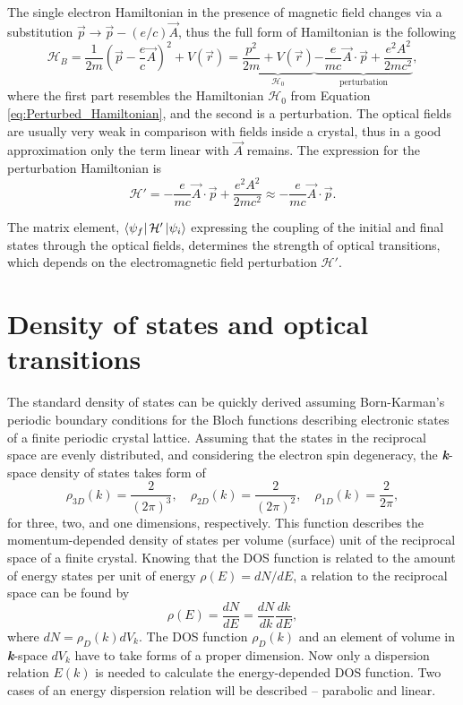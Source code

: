 \documentclass[titlepage,a4paper]{book}
\newcommand{\wciecie}{\quad\phantom{v}}
\begin{document}
The single electron Hamiltonian in the presence of magnetic field changes via a substitution $\vec{p} \rightarrow \vec{p} - (e/c)\vec{A}$, thus the full form of Hamiltonian is the following
\begin{equation}
\label{eq:Perturbed_Hamiltonian2}
\mathcal{H}_{B} = \frac{1}{2m}\left( \vec{p} - \frac{e}{c}\vec{A}\right)^2 + V(\vec{r}) = \underbrace{\frac{p^2}{2m} + V(\vec{r})}_{\mathcal{H}_0} \underbrace{-\frac{e}{mc}\vec{A}\cdot\vec{p}+\frac{e^2 A^2}{2mc^2}}_{\text{perturbation}},
\end{equation}
where the first part resembles the Hamiltonian $\mathcal{H}_0$ from Equation \ref{eq:Perturbed_Hamiltonian}, and the second is a perturbation. The optical fields are usually very weak in comparison with fields inside a crystal, thus in a good approximation only the term linear with $\vec{A}$ remains. The expression for the perturbation Hamiltonian is
\begin{equation}
\label{eq:Perturbed_Hamiltonian3}
\mathcal{H}' = -\frac{e}{mc}\vec{A}\cdot\vec{p}+\frac{e^2 A^2}{2mc^2} \approx -\frac{e}{mc}\vec{A}\cdot\vec{p}.
\end{equation}

The matrix element, $\bra{\psi_f}\mathcal{H}'\ket{\psi_i}$ expressing the coupling of the initial and final states through the optical fields, determines the strength of optical transitions, which depends on the electromagnetic field perturbation $\mathcal{H}'$.

\section{Density of states and optical transitions}
\label{section:DOS}
\wciecie
The standard density of states can be quickly derived assuming Born-Karman's periodic boundary conditions for the Bloch functions describing electronic states of a finite periodic crystal lattice. Assuming that the states in the reciprocal space are evenly distributed, and considering the electron spin degeneracy, the \textbf{\textit{k}}-space density of states takes form of
\begin{equation}
\label{eq:DOS_2}
\rho_{3D} (k) = \frac{2}{(2\pi)^{3}},\quad \rho_{2D} (k) = \frac{2}{(2\pi)^{2}},\quad \rho_{1D} (k) = \frac{2}{2\pi},
\end{equation}
for three, two, and one dimensions, respectively. This function describes the momentum-depended density of states per volume (surface) unit of the reciprocal space of a finite crystal. Knowing that the DOS function is related to the amount of energy states per unit of energy $\rho (E) = dN/dE$, a relation to the reciprocal space can be found by
\begin{equation}
\label{eq:DOS_3}
\rho (E) = \frac{dN}{dE} = \frac{dN}{dk}\frac{dk}{dE},
\end{equation}
where $dN = \rho_D (k) dV_k$. The DOS function $\rho_D (k)$ and an element of volume in \textbf{\textit{k}}-space $dV_k$ have to take forms of a proper dimension. Now only a dispersion relation $E(k)$ is needed to calculate the energy-depended DOS function. Two cases of an energy dispersion relation will be described -- parabolic and linear.
 
\end{document}
